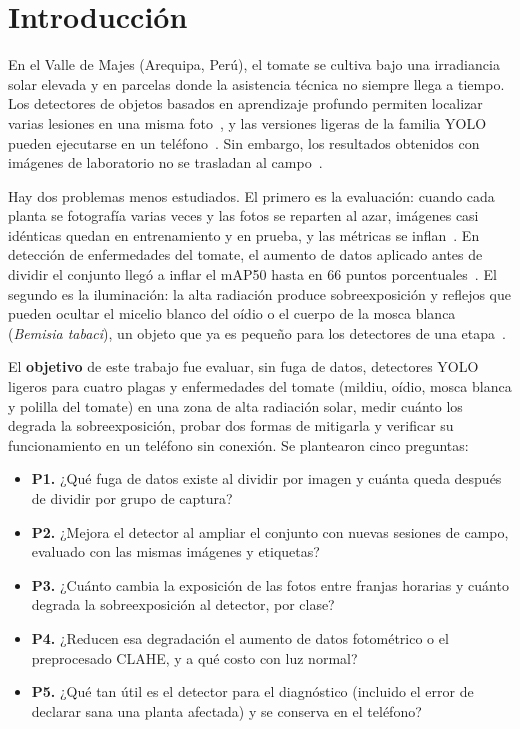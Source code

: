 \documentclass[sensors,article,submit,pdftex,moreauthors]{Definitions/mdpi}
\begin{document}
\section{Introducción}

En el Valle de Majes (Arequipa, Perú), el tomate se cultiva bajo una irradiancia solar elevada y en parcelas donde la asistencia técnica no siempre llega a tiempo. Los detectores de objetos basados en aprendizaje profundo permiten localizar varias lesiones en una misma foto~\cite{Fuentes2017}, y las versiones ligeras de la familia YOLO pueden ejecutarse en un teléfono~\cite{Zhong2024,Wang2025}. Sin embargo, los resultados obtenidos con imágenes de laboratorio no se trasladan al campo~\cite{Mohanty2016,Jelali2024}.

Hay dos problemas menos estudiados. El primero es la evaluación: cuando cada planta se fotografía varias veces y las fotos se reparten al azar, imágenes casi idénticas quedan en entrenamiento y en prueba, y las métricas se inflan~\cite{Kapoor2023}. En detección de enfermedades del tomate, el aumento de datos aplicado antes de dividir el conjunto llegó a inflar el mAP50 hasta en 66 puntos porcentuales~\cite{Gerz2025}. El segundo es la iluminación: la alta radiación produce sobreexposición y reflejos que pueden ocultar el micelio blanco del oídio o el cuerpo de la mosca blanca (\emph{Bemisia tabaci}), un objeto que ya es pequeño para los detectores de una etapa~\cite{Zhang2024Jute,Zhao2025}.

El \textbf{objetivo} de este trabajo fue evaluar, sin fuga de datos, detectores YOLO ligeros para cuatro plagas y enfermedades del tomate (mildiu, oídio, mosca blanca y polilla del tomate) en una zona de alta radiación solar, medir cuánto los degrada la sobreexposición, probar dos formas de mitigarla y verificar su funcionamiento en un teléfono sin conexión. Se plantearon cinco preguntas:
\begin{itemize}[leftmargin=*,labelsep=4.9mm]
\item \textbf{P1.} ¿Qué fuga de datos existe al dividir por imagen y cuánta queda después de dividir por grupo de captura?
\item \textbf{P2.} ¿Mejora el detector al ampliar el conjunto con nuevas sesiones de campo, evaluado con las mismas imágenes y etiquetas?
\item \textbf{P3.} ¿Cuánto cambia la exposición de las fotos entre franjas horarias y cuánto degrada la sobreexposición al detector, por clase?
\item \textbf{P4.} ¿Reducen esa degradación el aumento de datos fotométrico o el preprocesado CLAHE, y a qué costo con luz normal?
\item \textbf{P5.} ¿Qué tan útil es el detector para el diagnóstico (incluido el error de declarar sana una planta afectada) y se conserva en el teléfono?
\end{itemize}
\end{document}
